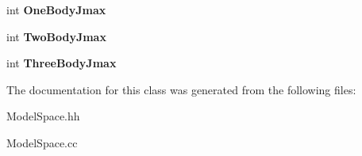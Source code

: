 \begin{DoxyCompactItemize}
\item 
\hypertarget{classModelSpace_a4c8f0a4476a3b3da3fced59d899f0134}{int {\bfseries One\-Body\-Jmax}}\label{classModelSpace_a4c8f0a4476a3b3da3fced59d899f0134}

\item 
\hypertarget{classModelSpace_aa2fd94965eb8a508e5ea7d4c879bae0b}{int {\bfseries Two\-Body\-Jmax}}\label{classModelSpace_aa2fd94965eb8a508e5ea7d4c879bae0b}

\item 
\hypertarget{classModelSpace_af9ca130d96f582d0ed1a4ef5373bcd05}{int {\bfseries Three\-Body\-Jmax}}\label{classModelSpace_af9ca130d96f582d0ed1a4ef5373bcd05}

\end{DoxyCompactItemize}


The documentation for this class was generated from the following files\-:\begin{DoxyCompactItemize}
\item 
Model\-Space.\-hh\item 
Model\-Space.\-cc\end{DoxyCompactItemize}
